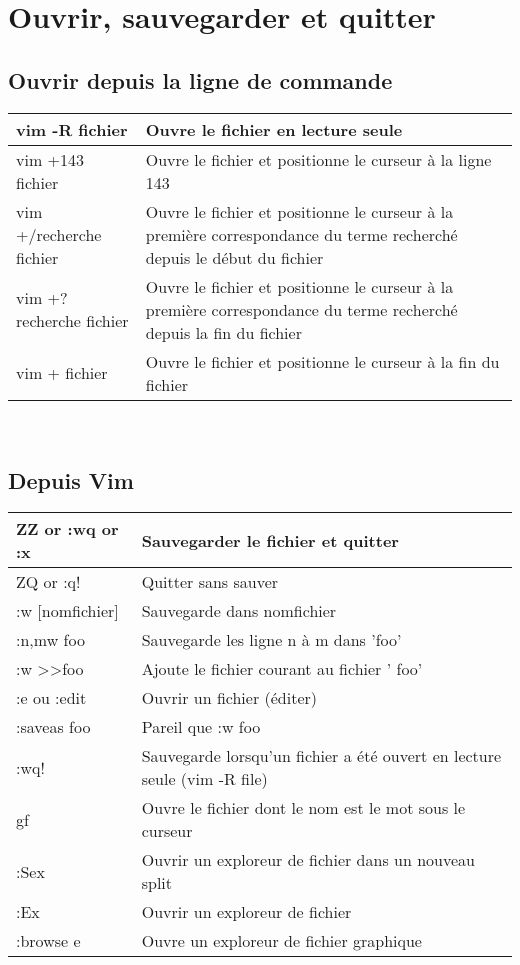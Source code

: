 \documentclass{article}
\begin{document}
\section{Ouvrir, sauvegarder et quitter}
\subsection{Ouvrir depuis la ligne de commande}
\begin{tabular}{|p{4cm}| l| }
\hline
vim -R  fichier & Ouvre le fichier en lecture seule \\ \hline
vim +143 fichier & Ouvre le fichier et positionne le curseur à la ligne 143 \\ \hline
vim +/recherche fichier & Ouvre le fichier et positionne le curseur à la première correspondance du terme recherché depuis le début du fichier   \\ \hline
vim +?recherche fichier & Ouvre le fichier et positionne le curseur à la première correspondance du terme recherché depuis la fin du fichier \\ \hline
vim + fichier & Ouvre le fichier et positionne le curseur à la fin du fichier  \\ \hline
\end{tabular}\\


\subsection{Depuis Vim}
\begin{tabular}{|p{3cm}| l| }
\hline
ZZ or :wq or :x & Sauvegarder le fichier et quitter\\ \hline
ZQ or :q! & Quitter sans sauver\\ \hline
:w [nomfichier]& Sauvegarde dans nomfichier \\ \hline
:n,mw foo & Sauvegarde les ligne n à m dans 'foo' \\ \hline
:w \textgreater \textgreater foo & Ajoute le fichier courant au fichier ' foo'\\ \hline
:e ou :edit & Ouvrir un fichier (éditer) \\ \hline
:saveas foo & Pareil que :w foo \\ \hline
:wq! & Sauvegarde lorsqu'un fichier a été ouvert en lecture seule (vim -R file) \\ \hline
gf & Ouvre le fichier dont le nom est le mot sous le curseur\\ \hline
:Sex & Ouvrir un exploreur de fichier dans un nouveau split\\ \hline
:Ex & Ouvrir un exploreur de fichier\\ \hline
:browse e & Ouvre un exploreur de fichier graphique \\ \hline
\end{tabular}\\
\end{document}
